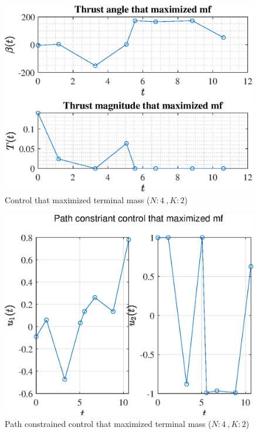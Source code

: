 \documentclass[]{article}
\begin{document}
	\begin{figure}
		\centering
		\includegraphics[scale=0.75]{control_N4_K2_C3_mf.eps}
		\caption{Control that maximized terminal mass (\(N:4\ , K:2\))}
		\label{fig:control_N4_K2_C3_mf}
	\end{figure}
	\begin{figure}
		\centering
		\includegraphics[scale=0.75]{path_N4_K2_C3_mf.eps}
		\caption{Path constrained control that maximized terminal mass (\(N:4\ , K:2\))}
		\label{fig:path_N4_K2_C3_mf}
	\end{figure}
\end{document}

